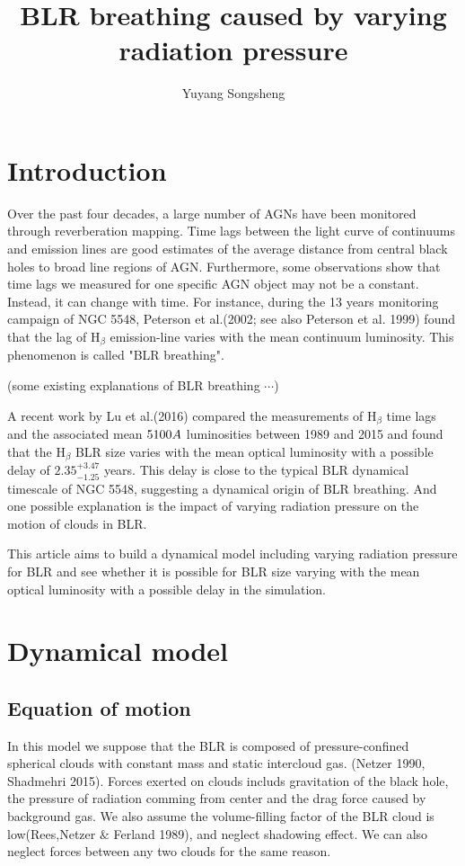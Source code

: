 \documentclass{article}
\author{Yuyang Songsheng}
\title{BLR breathing caused by varying radiation pressure}
\begin{document}
\maketitle
\section{Introduction}
Over the past four decades, a large number of AGNs have been monitored through reverberation mapping. Time lags between the light curve of continuums and emission lines are good estimates of the average distance from central black holes to broad line regions of AGN. Furthermore, some observations show that time lags we measured for one specific AGN object may not be a constant. Instead, it can change with time. For instance, during the 13 years monitoring campaign of NGC 5548, Peterson et al.(2002; see also Peterson et al. 1999) found that the lag of $\mathrm{H}_{\beta}$ emission-line varies with the mean continuum luminosity. This phenomenon is called "BLR breathing". 

(some existing explanations of BLR breathing $\cdots$)

A recent work by Lu et al.(2016)  compared the measurements of $\mathrm{H}_{\beta}$ time lags and the associated mean $5100 \\A$ luminosities between 1989 and 2015 and found that the $\mathrm{H}_{\beta}$ BLR size varies with the mean optical luminosity with a possible delay of $2.35^{+3.47}_{-1.25}$ years. This delay is close to the typical BLR dynamical timescale of NGC 5548, suggesting a dynamical origin of BLR breathing. And one possible explanation is the impact of varying radiation pressure on the motion of clouds in BLR. 

This article aims to build a dynamical model including varying radiation pressure for BLR and see whether it is possible for BLR size varying with the mean optical luminosity with a possible delay in the simulation.

\section{Dynamical model}
\subsection{Equation of motion}
In this model we suppose that the BLR is composed of pressure-confined spherical clouds with constant mass and static intercloud gas. (Netzer 1990, Shadmehri 2015). Forces exerted on clouds includs gravitation of the black hole, the pressure of radiation comming from center and the drag force caused by background gas. We also assume the volume-filling factor of the BLR cloud is low(Rees,Netzer $\&$ Ferland 1989), and neglect shadowing effect. We can also neglect forces between any two clouds for the same reason. 
\end{document}
